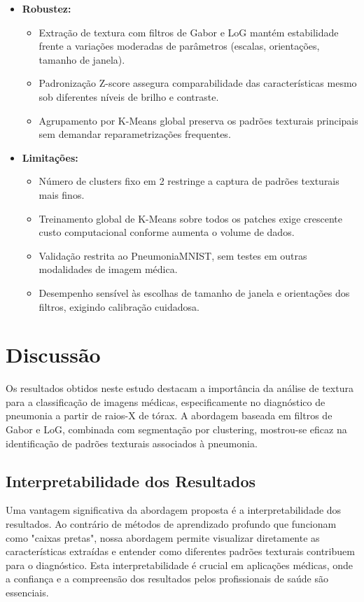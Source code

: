 \documentclass[sigconf,nonacm]{acmart}
\begin{document}
\begin{itemize}
  \item \textbf{Robustez:}
    \begin{itemize}
      \item Extração de textura com filtros de Gabor e LoG mantém estabilidade frente a variações moderadas de parâmetros (escalas, orientações, tamanho de janela).
      \item Padronização Z-score assegura comparabilidade das características mesmo sob diferentes níveis de brilho e contraste.
      \item Agrupamento por K-Means global preserva os padrões texturais principais sem demandar reparametrizações frequentes.
    \end{itemize}
  \item \textbf{Limitações:}
    \begin{itemize}
      \item Número de clusters fixo em 2 restringe a captura de padrões texturais mais finos.
      \item Treinamento global de K-Means sobre todos os patches exige crescente custo computacional conforme aumenta o volume de dados.
      \item Validação restrita ao PneumoniaMNIST, sem testes em outras modalidades de imagem médica.
      \item Desempenho sensível às escolhas de tamanho de janela e orientações dos filtros, exigindo calibração cuidadosa.
    \end{itemize}
\end{itemize}


\section{Discussão}

Os resultados obtidos neste estudo destacam a importância da análise de textura para a classificação de imagens médicas, especificamente no diagnóstico de pneumonia a partir de raios-X de tórax. A abordagem baseada em filtros de Gabor e LoG, combinada com segmentação por clustering, mostrou-se eficaz na identificação de padrões texturais associados à pneumonia.

\subsection{Interpretabilidade dos Resultados}

Uma vantagem significativa da abordagem proposta é a interpretabilidade dos resultados. Ao contrário de métodos de aprendizado profundo que funcionam como "caixas pretas", nossa abordagem permite visualizar diretamente as características extraídas e entender como diferentes padrões texturais contribuem para o diagnóstico. Esta interpretabilidade é crucial em aplicações médicas, onde a confiança e a compreensão dos resultados pelos profissionais de saúde são essenciais.
\end{document}

